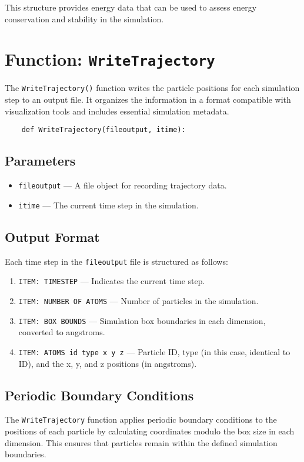 \documentclass[12pt, ngerman]{report}
\begin{document}
This structure provides energy data that can be used to assess energy conservation and stability in the simulation.

\section{Function: \texttt{WriteTrajectory}}
\label{sec:writetrajectory}

The \texttt{WriteTrajectory()} function writes the particle positions for each simulation step to an output file. It organizes the information in a format compatible with visualization tools and includes essential simulation metadata.

\begin{verbatim}
	def WriteTrajectory(fileoutput, itime):
\end{verbatim}

\subsection*{Parameters}
\begin{itemize}
	\item \texttt{fileoutput} --- A file object for recording trajectory data.
	\item \texttt{itime} --- The current time step in the simulation.
\end{itemize}

\subsection*{Output Format}
Each time step in the \texttt{fileoutput} file is structured as follows:
\begin{enumerate}
	\item \texttt{ITEM: TIMESTEP} --- Indicates the current time step.
	\item \texttt{ITEM: NUMBER OF ATOMS} --- Number of particles in the simulation.
	\item \texttt{ITEM: BOX BOUNDS} --- Simulation box boundaries in each dimension, converted to angstroms.
	\item \texttt{ITEM: ATOMS id type x y z} --- Particle ID, type (in this case, identical to ID), and the x, y, and z positions (in angstroms).
\end{enumerate}

\subsection*{Periodic Boundary Conditions}
The \texttt{WriteTrajectory} function applies periodic boundary conditions to the positions of each particle by calculating coordinates modulo the box size in each dimension. This ensures that particles remain within the defined simulation boundaries.
\end{document}
